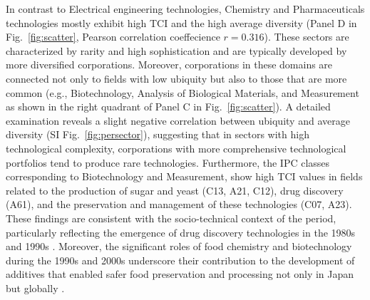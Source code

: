 \documentclass[fleqn,10pt]{wlscirep}
\begin{document}
In contrast to Electrical engineering technologies, Chemistry and Pharmaceuticals technologies mostly exhibit high TCI and the high average diversity (Panel D in Fig.~\ref{fig:scatter}, Pearson correlation coeffecience $r=0.316$).
These sectors are characterized by rarity and high sophistication and are typically developed by more diversified corporations. 
Moreover, corporations in these domains are connected not only to fields with low ubiquity but also to those that are more common (e.g., Biotechnology, Analysis of Biological Materials, and Measurement as shown in the right quadrant of Panel C in Fig.~\ref{fig:scatter}). 
A detailed examination reveals a slight negative correlation between ubiquity and average diversity (SI Fig.~\ref{fig:persector}), suggesting that in sectors with high technological complexity, corporations with more comprehensive technological portfolios tend to produce rare technologies. 
Furthermore, the IPC classes corresponding to Biotechnology and Measurement, show high TCI values in fields related to the production of sugar and yeast (C13, A21, C12), drug discovery (A61), and the preservation and management of these technologies (C07, A23). These findings are consistent with the socio-technical context of the period, particularly reflecting the emergence of drug discovery technologies in the 1980s and 1990s \cite{Sakakibara2014,Nakamura2022}. Moreover, the significant roles of food chemistry and biotechnology during the 1990s and 2000s underscore their contribution to the development of additives that enabled safer food preservation and processing not only in Japan but globally \cite{Bhatia2018,Murakami2024}.
\end{document}
